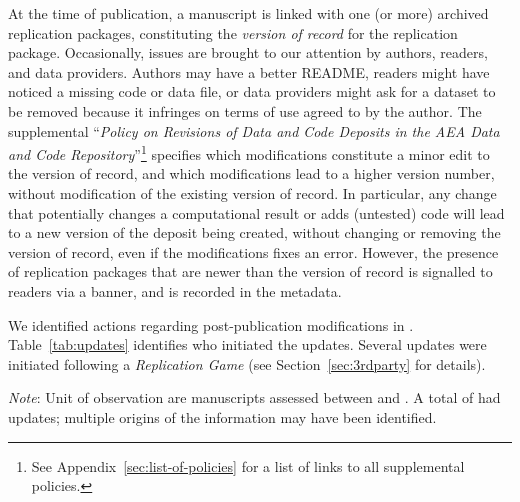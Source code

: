 At the time of publication, a manuscript is linked with one (or more) archived replication packages, constituting the \textit{version of record} for the replication package. Occasionally, issues are brought to our attention by authors, readers, and data providers. Authors may have a better README, readers might have noticed a missing code or data file, or data providers might ask for a dataset to be removed because it infringes on terms of use agreed to by the author. The supplemental ``\textit{Policy on Revisions of Data and Code Deposits in the AEA Data and Code Repository}''\footnote{See Appendix~\ref{sec:list-of-policies} for a list of links to all supplemental policies.} specifies which modifications constitute a minor edit to the version of record, and which modifications lead to a higher version number, without modification of the existing version of record. In particular, any change that potentially changes a computational result or adds (untested) code will lead to a new version of the deposit being created, without changing or removing the version of record, even if the modifications fixes an error. However, the presence of replication packages that are newer than the version of record is signalled to readers via a banner, and is recorded in the metadata.

We identified \mcpubupdates{} actions regarding post-publication modifications in \reportyear{}.
Table~\ref{tab:updates} identifies who initiated the updates.   Several updates were initiated following a  \textit{Replication Game} (see Section~\ref{sec:3rdparty} for details).

\begin{center}
    \label{tab:updates}
    
     \begin{threeparttable}
     
 
    \begin{tablenotes}
    \footnotesize
    \item[] \textit{Note}: Unit of observation are manuscripts assessed between \firstday{} and \lastday{}. A total of \mcpubupdates{} had updates; multiple origins of the information may have been identified.
    \end{tablenotes}
    \end{threeparttable}
\end{center}

